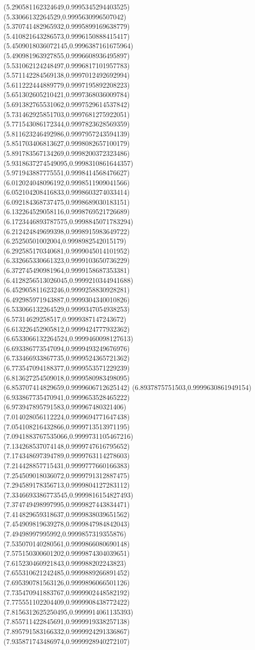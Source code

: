 {(5.290581162324649,0.9995345294403525)
(5.33066132264529,0.9995630996507042)
(5.370741482965932,0.9995899169638779)
(5.410821643286573,0.9996150888415417)
(5.4509018036072145,0.9996387161675964)
(5.490981963927855,0.9996608936495897)
(5.531062124248497,0.9996817101957783)
(5.571142284569138,0.9997012492692994)
(5.611222444889779,0.9997195892208223)
(5.651302605210421,0.9997368036009784)
(5.691382765531062,0.9997529614537842)
(5.731462925851703,0.9997681275922051)
(5.771543086172344,0.9997823628569359)
(5.811623246492986,0.9997957243594139)
(5.851703406813627,0.9998082657100179)
(5.891783567134269,0.9998200372323486)
(5.9318637274549095,0.9998310861644357)
(5.971943887775551,0.9998414568476627)
(6.012024048096192,0.9998511909041566)
(6.052104208416833,0.9998603274033414)
(6.092184368737475,0.9998689030183151)
(6.132264529058116,0.9998769521726689)
(6.1723446893787575,0.9998845071783294)
(6.212424849699398,0.9998915983649722)
(6.25250501002004,0.9998982542015179)
(6.292585170340681,0.9999045014101952)
(6.332665330661323,0.9999103650736229)
(6.372745490981964,0.9999158687353381)
(6.4128256513026045,0.9999210344941688)
(6.452905811623246,0.9999258830928281)
(6.492985971943887,0.9999304340010826)
(6.533066132264529,0.9999347054938253)
(6.57314629258517,0.9999387147243672)
(6.613226452905812,0.9999424777932362)
(6.6533066132264524,0.9999460098127613)
(6.693386773547094,0.9999493249676976)
(6.733466933867735,0.9999524365721362)
(6.773547094188377,0.9999553571229239)
(6.813627254509018,0.9999580983498095)
(6.853707414829659,0.9999606712625142)
(6.8937875751503,0.9999630861949154)
(6.933867735470941,0.9999653528465222)
(6.973947895791583,0.999967480321406)
(7.014028056112224,0.9999694771647438)
(7.054108216432866,0.9999713513971195)
(7.0941883767535066,0.9999731105467216)
(7.134268537074148,0.9999747616795652)
(7.174348697394789,0.9999763114278603)
(7.214428857715431,0.9999777660166383)
(7.254509018036072,0.9999791312887475)
(7.294589178356713,0.9999804127283112)
(7.3346693386773545,0.9999816154827493)
(7.374749498997995,0.9999827443834471)
(7.414829659318637,0.9999838039651562)
(7.454909819639278,0.9999847984842043)
(7.49498997995992,0.9999857319355876)
(7.535070140280561,0.9999866080690148)
(7.575150300601202,0.9999874304039651)
(7.615230460921843,0.999988202243823)
(7.655310621242485,0.9999889266891452)
(7.695390781563126,0.9999896066501126)
(7.735470941883767,0.9999902448582192)
(7.775551102204409,0.9999908438772422)
(7.8156312625250495,0.9999914061135393)
(7.855711422845691,0.9999919338257138)
(7.895791583166332,0.9999924291336867)
(7.935871743486974,0.9999928940272107)
}
